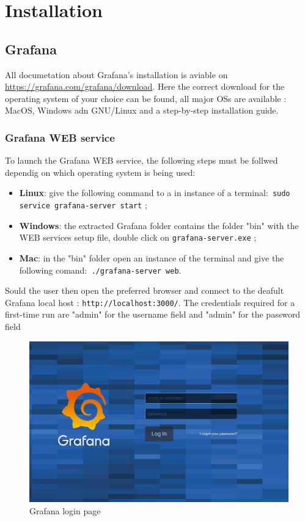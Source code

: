 \section{Installation}
\subsection{Grafana}
All documetation about Grafana's installation is aviable on \href{URL}{https://grafana.com/grafana/download}.
Here the correct download for the operating system of your choice can be found, all major OSs are available : MacOS, Windows adn GNU\slash Linux and a step-by-step installation guide.
\subsubsection{Grafana WEB service}

To launch the Grafana WEB service, the following steps must be follwed dependig on which operating system is being used:

\begin{itemize}
\item\textbf{Linux}: give the following command to a in instance of a terminal:\texttt{ sudo service grafana-server start} ;
\item\textbf{Windows}: the extracted Grafana folder contains the folder "bin" with the WEB services setup file, double click on \texttt{grafana-server.exe} ;
\item\textbf{Mac}: in the "bin" folder open an instance of the  terminal and give the following comand:\texttt{ ./grafana-server web}.
\end{itemize}

Sould the user then open the preferred browser and connect to the deafult Grafana local host : \texttt{http://localhost:3000/}.
The credentials required for a first-time run are "admin" for the username field and "admin" for the password field
\begin{figure}[H]
\centering
\includegraphics[scale=0.65]{img/install/login.jpg}
\caption{Grafana login page}
\end{figure}